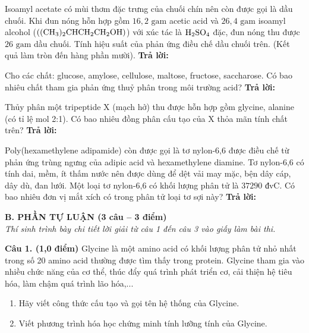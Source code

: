 \documentclass[11pt,a4paper]{article}
\begin{document}
\begin{ex}
Isoamyl acetate có mùi thơm đặc trưng của chuối chín nên còn được gọi là dầu chuối. Khi đun nóng hỗn hợp gồm $16,2\text{ gam}$ acetic acid và $26,4\text{ gam}$ isoamyl alcohol ($\ce{((CH3)2CHCH2CH2OH)}$) với xúc tác là $\ce{H2SO4}$ đặc, đun nóng thu được $26\text{ gam}$ dầu chuối. Tính hiệu suất của phản ứng điều chế dầu chuối trên. (Kết quả làm tròn đến hàng phần mười).
\hfill \textbf{Trả lời:} \dotfill
\end{ex}
\begin{ex}
Cho các chất: glucose, amylose, cellulose, maltose, fructose, saccharose. Có bao nhiêu chất tham gia phản ứng thuỷ phân trong môi trường acid?
\hfill \textbf{Trả lời:} \dotfill
\end{ex}
\begin{ex}
Thủy phân một tripeptide X (mạch hở) thu được hỗn hợp gồm glycine, alanine (có tỉ lệ mol 2:1). Có bao nhiêu đồng phân cấu tạo của X thỏa mãn tính chất trên?
\hfill \textbf{Trả lời:} \dotfill
\end{ex}
\begin{ex}
Poly(hexamethylene adipamide) còn được gọi là tơ nylon-6,6 được điều chế từ phản ứng trùng ngưng của adipic acid và hexamethylene diamine. Tơ nylon-6,6 có tính dai, mềm, ít thấm nước nên được dùng để dệt vải may mặc, bện dây cáp, dây dù, đan lưới. Một loại tơ nylon-6,6 có khối lượng phân tử là $37290\text{ đvC}$. Có bao nhiêu đơn vị mắt xích có trong phân tử loại tơ sợi này?
\hfill \textbf{Trả lời:} \dotfill
\end{ex}
\vspace{4pt}
\noindent
{\color{mainGreen}\textbf{\Large B. PHẦN TỰ LUẬN (3 câu – 3 điểm)}}\\
\textit{\small Thí sinh trình bày chi tiết lời giải từ câu 1 đến câu 3 vào giấy làm bài thi.}
\vspace{3pt}

\noindent
\textbf{Câu 1. (1,0 điểm)} Glycine là một amino acid có khối lượng phân tử nhỏ nhất trong số 20 amino acid thường được tìm thấy trong protein. Glycine tham gia vào nhiều chức năng của cơ thể, thúc đẩy quá trình phát triển cơ, cải thiện hệ tiêu hóa, làm chậm quá trình lão hóa,...
\begin{enumerate}[label=\alph*.,leftmargin=20pt,itemsep=1pt]
\item Hãy viết công thức cấu tạo và gọi tên hệ thống của Glycine.
\item Viết phương trình hóa học chứng minh tính lưỡng tính của Glycine.
\end{enumerate}
\end{document}
